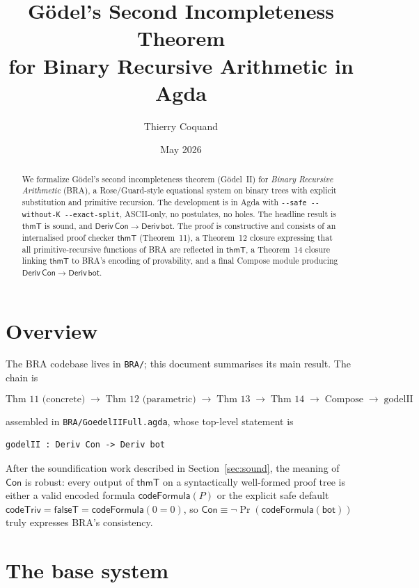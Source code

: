 \documentclass[11pt]{article}
\title{G\"odel's Second Incompleteness Theorem\\
  for Binary Recursive Arithmetic in Agda}
\author{Thierry Coquand}
\date{May 2026}
\newcommand{\Deriv}{\mathsf{Deriv}}
\newcommand{\thmT}{\mathsf{thmT}}
\newcommand{\Con}{\mathsf{Con}}
\newcommand{\bot}{\mathsf{bot}}
\newcommand{\codeFormula}{\mathsf{codeFormula}}
\newcommand{\codeTriv}{\mathsf{codeTriv}}
\newcommand{\falseT}{\mathsf{falseT}}
\begin{document}
\maketitle

\begin{abstract}
We formalize G\"odel's second incompleteness theorem (G\"odel~II) for
\emph{Binary Recursive Arithmetic} (BRA), a Rose/Guard-style equational
system on binary trees with explicit substitution and primitive
recursion.  The development is in Agda with
\verb|--safe --without-K --exact-split|, ASCII-only, no postulates, no
holes.  The headline result is
\(\thmT \text{ is sound, and } \Deriv\,\Con \to \Deriv\,\bot.\)
The proof is constructive and consists of an internalised proof
checker $\thmT$ (Theorem~11), a Theorem~12 closure expressing that all
primitive-recursive functions of BRA are reflected in $\thmT$, a
Theorem~14 closure linking $\thmT$ to BRA's encoding of provability,
and a final Compose module producing $\Deriv\,\Con \to \Deriv\,\bot$.
\end{abstract}

\section{Overview}

The BRA codebase lives in \texttt{BRA/}; this document summarises its
main result.  The chain is

\[
\text{Thm 11 (concrete)} \;\to\;
\text{Thm 12 (parametric)} \;\to\;
\text{Thm 13} \;\to\;
\text{Thm 14} \;\to\;
\text{Compose} \;\to\;
\text{godelII}
\]

assembled in
\verb|BRA/GoedelIIFull.agda|, whose top-level statement is
\begin{verbatim}
godelII : Deriv Con -> Deriv bot
\end{verbatim}

After the soundification work described in
Section~\ref{sec:sound}, the meaning of $\Con$ is robust: every
output of $\thmT$ on a syntactically well-formed proof tree is either
a valid encoded formula $\codeFormula(P)$ or the explicit safe default
$\codeTriv = \falseT = \codeFormula(0=0)$, so $\Con \equiv \neg
\Pr(\codeFormula(\bot))$ truly expresses BRA's consistency.

\section{The base system}
\end{document}
